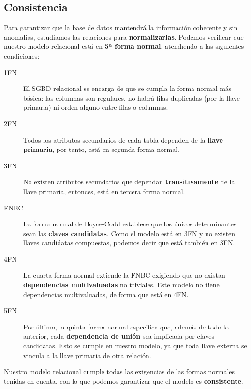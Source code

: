 \smallskip

\subsection{Consistencia}

Para garantizar que la base de datos mantendrá la información coherente y sin anomalías, estudiamos las relaciones para \textbf{normalizarlas}. Podemos verificar que nuestro modelo relacional está en \textbf{5ª forma normal}, atendiendo a las siguientes condiciones:

\begin{description}
	\item[1FN] El \acrshort{SGBD} relacional se encarga de que se cumpla la forma normal más básica: las columnas son regulares, no habrá filas duplicadas (por la llave primaria) ni orden alguno entre filas o columnas. \cite{wiki_1fn}
	\item[2FN] Todos los atributos secundarios de cada tabla dependen de la \textbf{llave primaria}, por tanto, está en segunda forma normal. \cite{wiki_2fn}
	\item[3FN] No existen atributos secundarios que dependan \textbf{transitivamente} de la llave primaria, entonces, está en tercera forma normal. \cite{wiki_3fn}
	\item[FNBC] La forma normal de Boyce-Codd establece que los únicos determinantes sean las \textbf{claves candidatas}. Como el modelo está en 3FN y no existen llaves candidatas compuestas, podemos decir que está también en 3FN. \cite{wiki_fnbc}
	\item[4FN] La cuarta forma normal extiende la FNBC exigiendo que no existan \textbf{dependencias multivaluadas} no triviales. Este modelo no tiene dependencias multivaluadas, de forma que está en 4FN. \cite{wiki_4fn}
	\item[5FN] Por último, la quinta forma normal especifica que, además de todo lo anterior, cada \textbf{dependencia de unión} sea implicada por claves candidatas. Esto se cumple en nuestro modelo, ya que toda llave externa se vincula a la llave primaria de otra relación. \cite{wiki_5fn}
\end{description}

Nuestro modelo relacional cumple todas las exigencias de las formas normales tenidas en cuenta, con lo que podemos garantizar que el modelo es \textbf{consistente}.

\smallskip

